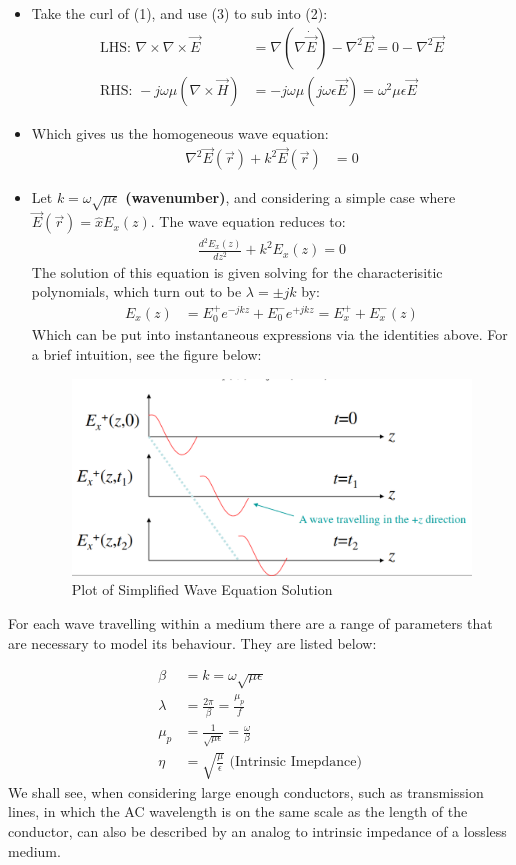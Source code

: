 \documentclass{book}
\begin{document}
\begin{itemize}
	\item Take the curl of (1), and use (3) to sub into (2):
	\begin{align*}
		\text{LHS: } \nabla  \times \nabla \times \vec{E} &= \nabla (\nabla \dot \vec{E}) - \nabla^2 \vec{E} = 0-\nabla^2\vec{E} \\
		\text{RHS: } -j\omega \mu (\nabla \times \vec{H}) &= -j \omega \mu (j\omega \epsilon \vec{E}) = \omega^2 \mu \epsilon \vec{E} 
	\end{align*}
	\item Which gives us the homogeneous wave equation:
	\begin{align*}
		\nabla^2 \vec{E}(\vec{r}) +k^2 \vec{E}(\vec{r}) &= 0
	\end{align*}
	\item  Let $k=\omega \sqrt{\mu \epsilon}$ \textbf{(wavenumber)}, and considering a simple case where $\vec{E}(\vec{r}) = \hat{x} E_x (z)$. The wave equation reduces to:
	\begin{align*}
		\frac{d^2 E_x(z)}{dz^2} + k^2 E_x(z)=0
	\end{align*}
	The solution of this equation is given solving for the characterisitic polynomials, which turn out to be $\lambda=\pm jk$ by:
	\begin{align*}
		E_x (z) &= E_0 ^+ e^{-jkz} + E_0^- e^{+jkz} = E_x^+ + E_x ^-(z) 
	\end{align*}
	Which can be put into instantaneous expressions via the identities above. For a brief intuition, see the figure below:
	
	\begin{figure}[h]
		\centering
		\includegraphics[width=0.5\linewidth]{Screenshots/phasor2}
		\caption{Plot of Simplified Wave Equation Solution}
		\label{fig:phasor2}
	\end{figure}
\end{itemize}

For each wave travelling within a medium there are a range of parameters that are necessary to model its behaviour. They are listed below:

\begin{align*}
	\beta &= k = \omega \sqrt{\mu \epsilon} \\
	\lambda &= \frac{2\pi}{\beta} = \frac{\mu_p}{f} \\
	\mu_p &= \frac{1}{\sqrt{\mu \epsilon}} = \frac{\omega}{\beta} \\
 \eta & = \sqrt{\frac{\mu}{\epsilon}} \text{ (Intrinsic Imepdance)}
\end{align*}
We shall see, when considering large enough conductors, such as transmission lines, in which the AC wavelength is on the same scale as the length of the conductor, can also be described by an analog to intrinsic impedance of a lossless medium.
\end{document}
